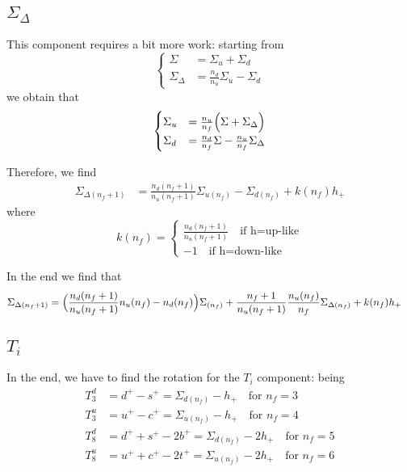 \documentclass[a4paper,oneside]{article}
\begin{document}
\subsection{$\Sigma_{\Delta}$}
This component requires a bit more work: starting from
\begin{equation*}
\begin{cases}
\Sigma &= \Sigma_u+\Sigma_d \\
\Sigma_{\Delta} &= \frac{n_d}{n_u}\Sigma_u-\Sigma_d
\end{cases}
\end{equation*}
we obtain that
\begin{equation*}
\begin{cases}
\Sigma_u &= \frac{n_u}{n_f}\Bigl(\Sigma+\Sigma_{\Delta} \Bigr)\\
\Sigma_d &= \frac{n_d}{n_f}\Sigma-\frac{n_u}{n_f}\Sigma_{\Delta}
\end{cases}
\end{equation*}

Therefore, we find
\begin{align*}
\Sigma_{\Delta(n_f+1)} &= \frac{n_d(n_f+1)}{n_u(n_f+1)}\Sigma_{u(n_f)} - \Sigma_{d(n_f)} + k(n_f) h_+
\end{align*}
where
\begin{equation*}
k(n_f) =
\begin{cases}
\frac{n_d(n_f+1)}{n_u(n_f+1)} \quad \text{if h=up-like}\\
-1  \quad \text{if h=down-like}
\end{cases}
\end{equation*}

In the end we find that
\begin{align*}
\Sigma_{\Delta(n_f+1)} &= \Bigl(\frac{n_d(n_f+1)}{n_u(n_f+1)}n_u(n_f)-n_d(n_f)\Bigr)\Sigma_{(n_f)} + \frac{n_f+1}{n_u(n_f+1)}\frac{n_u(n_f)}{n_f}\Sigma_{\Delta(n_f)} + k(n_f) h_+
\end{align*}

\subsection{$T_i$}
In the end, we have to find the rotation for the $T_i$ component: being
\begin{align*}
T_3^d &=d^+ - s^+ = \Sigma_{d(n_f)} - h_+\quad \text{for $n_f=3$}\\
T_3^u &=u^+ - c^+ =\Sigma_{u(n_f)} - h_+\quad \text{for $n_f=4$}\\
T_8^d &=d^+ + s^+ - 2b^+ =\Sigma_{d(n_f)} - 2h_+\quad \text{for $n_f=5$}\\
T_8^u &=u^+ + c^+ - 2t^+ =\Sigma_{u(n_f)} - 2h_+\quad \text{for $n_f=6$}
\end{align*}
\end{document}
